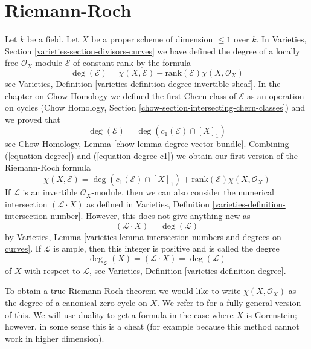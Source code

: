 \section{Riemann-Roch}
\label{section-Riemann-Roch}

\noindent
Let $k$ be a field. Let $X$ be a proper scheme of dimension $\leq 1$
over $k$. In Varieties, Section \ref{varieties-section-divisors-curves}
we have defined the degree of a locally free $\mathcal{O}_X$-module
$\mathcal{E}$ of constant rank by the formula
\begin{equation}
\label{equation-degree}
\deg(\mathcal{E}) =
\chi(X, \mathcal{E}) - \text{rank}(\mathcal{E})\chi(X, \mathcal{O}_X)
\end{equation}
see Varieties, Definition \ref{varieties-definition-degree-invertible-sheaf}.
In the chapter on Chow Homology we defined the first Chern class of
$\mathcal{E}$ as an operation on cycles
(Chow Homology, Section
\ref{chow-section-intersecting-chern-classes}) and we proved that
\begin{equation}
\label{equation-degree-c1}
\deg(\mathcal{E}) = \deg(c_1(\mathcal{E}) \cap [X]_1)
\end{equation}
see Chow Homology, Lemma \ref{chow-lemma-degree-vector-bundle}.
Combining (\ref{equation-degree}) and (\ref{equation-degree-c1})
we obtain our first version of the Riemann-Roch formula
\begin{equation}
\label{equation-rr}
\chi(X, \mathcal{E}) =
\deg(c_1(\mathcal{E}) \cap [X]_1) +
\text{rank}(\mathcal{E})\chi(X, \mathcal{O}_X)
\end{equation}
If $\mathcal{L}$ is an invertible $\mathcal{O}_X$-module, then
we can also consider the numerical intersection
$(\mathcal{L} \cdot X)$ as defined in
Varieties, Definition \ref{varieties-definition-intersection-number}.
However, this does not give anything new as
\begin{equation}
\label{equation-numerical-degree}
(\mathcal{L} \cdot X) = \deg(\mathcal{L})
\end{equation}
by Varieties, Lemma
\ref{varieties-lemma-intersection-numbers-and-degrees-on-curves}. If
$\mathcal{L}$ is ample, then this integer is positive and is
called the degree
\begin{equation}
\label{equation-degree-X}
\deg_\mathcal{L}(X) = (\mathcal{L} \cdot X) = \deg(\mathcal{L})
\end{equation}
of $X$ with respect to $\mathcal{L}$, see
Varieties, Definition \ref{varieties-definition-degree}.

\medskip\noindent
To obtain a true Riemann-Roch theorem we would like to write
$\chi(X, \mathcal{O}_X)$ as the degree of a canonical zero cycle on $X$.
We refer to \cite{F} for a fully general version of this. We will use
duality to get a formula in the case where $X$ is Gorenstein; however,
in some sense this is a cheat (for example because this method cannot
work in higher dimension).


